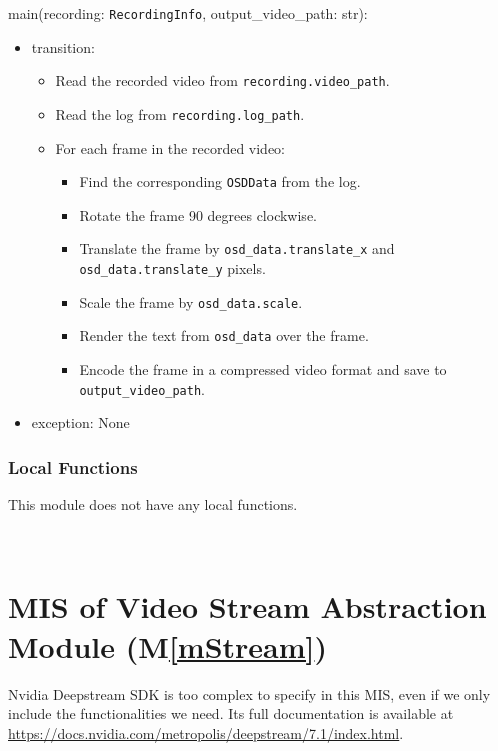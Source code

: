 \documentclass[12pt, titlepage]{article}
\newcommand{\mref}[1]{M\ref{#1}}
\begin{document}
\noindent main(recording: \texttt{RecordingInfo}, output\_video\_path: str):
\begin{itemize}
  \item transition:
        \begin{itemize}
          \item Read the recorded video from \texttt{recording.video\_path}.
          \item Read the log from \texttt{recording.log\_path}.
          \item For each frame in the recorded video:
                \begin{itemize}
                  \item Find the corresponding \texttt{OSDData} from the log.
                  \item Rotate the frame 90 degrees clockwise.
                  \item Translate the frame by \texttt{osd\_data.translate\_x} and
                        \texttt{osd\_data.translate\_y} pixels.
                  \item Scale the frame by \texttt{osd\_data.scale}.
                  \item Render the text from \texttt{osd\_data} over the frame.
                  \item Encode the frame in a compressed video format and save to
                        \texttt{output\_video\_path}.
                \end{itemize}
        \end{itemize}
  \item exception: None
\end{itemize}

\subsubsection{Local Functions}

This module does not have any local functions.

\ \

\section{MIS of Video Stream Abstraction Module (\mref{mStream})}

Nvidia Deepstream SDK is too complex to specify in this MIS, even if we only
include the functionalities we need. Its full documentation is available at
\url{https://docs.nvidia.com/metropolis/deepstream/7.1/index.html}.
\end{document}
